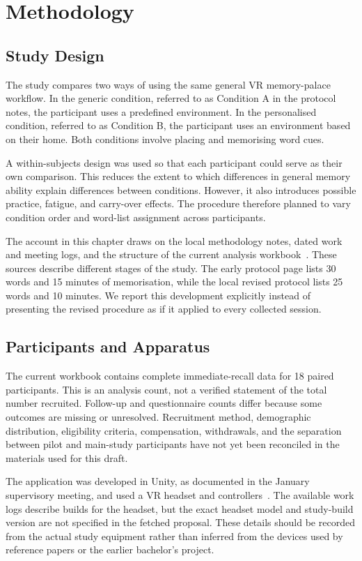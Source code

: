 \chapter{Methodology}
\label{chap:imp}

\section{Study Design}
The study compares two ways of using the same general VR memory-palace workflow. In the generic condition, referred to as Condition A in the protocol notes, the participant uses a predefined environment. In the personalised condition, referred to as Condition B, the participant uses an environment based on their home. Both conditions involve placing and memorising word cues.

A within-subjects design was used so that each participant could serve as their own comparison. This reduces the extent to which differences in general memory ability explain differences between conditions. However, it also introduces possible practice, fatigue, and carry-over effects. The procedure therefore planned to vary condition order and word-list assignment across participants.

The account in this chapter draws on the local methodology notes, dated work and meeting logs, and the structure of the current analysis workbook~\cite{sroorlogs,srooranalysis}. These sources describe different stages of the study. The early protocol page lists 30 words and 15 minutes of memorisation, while the local revised protocol lists 25 words and 10 minutes. We report this development explicitly instead of presenting the revised procedure as if it applied to every collected session.

\section{Participants and Apparatus}
The current workbook contains complete immediate-recall data for 18 paired participants. This is an analysis count, not a verified statement of the total number recruited. Follow-up and questionnaire counts differ because some outcomes are missing or unresolved. Recruitment method, demographic distribution, eligibility criteria, compensation, withdrawals, and the separation between pilot and main-study participants have not yet been reconciled in the materials used for this draft.

The application was developed in Unity, as documented in the January supervisory meeting, and used a VR headset and controllers~\cite{meetingjan2026}. The available work logs describe builds for the headset, but the exact headset model and study-build version are not specified in the fetched proposal. These details should be recorded from the actual study equipment rather than inferred from the devices used by reference papers or the earlier bachelor's project.

